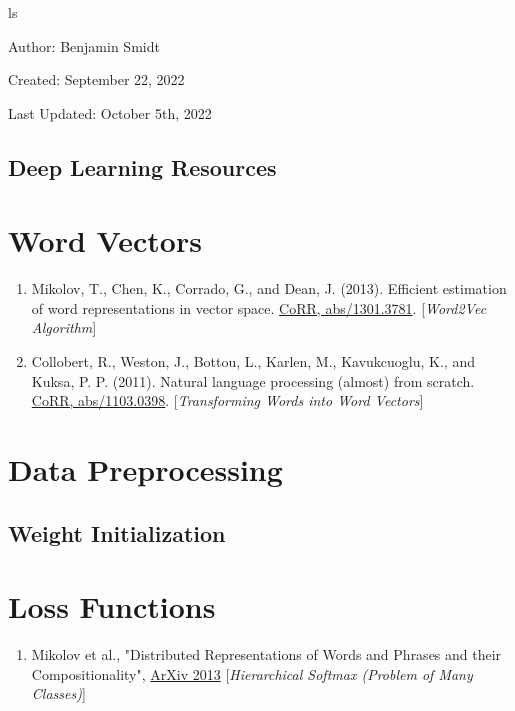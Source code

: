 ls




\noindent Author: Benjamin Smidt

\noindent Created: September 22, 2022

\noindent Last Updated: October 5th, 2022
\begin{center}
\section*{Deep Learning Resources}
\end{center}

\tableofcontents{}

\section{Word Vectors}
\begin{enumerate}
\item Mikolov, T., Chen, K., Corrado, G., and Dean, J. (2013). 
    Efficient estimation of word representations in vector space. 
    \href{https://arxiv.org/abs/1301.3781}{CoRR, abs/1301.3781}. 
    [\emph{Word2Vec Algorithm}]
\item Collobert, R., Weston, J., Bottou, L., Karlen, M., Kavukcuoglu, K., and Kuksa, P. P. 
    (2011). Natural language processing (almost) from scratch. 
    \href{https://arxiv.org/abs/1103.0398}{CoRR, abs/1103.0398}.
    [\emph{Transforming Words into Word Vectors}]
\end{enumerate}

\section{Data Preprocessing}

\subsection{Weight Initialization}

\section{Loss Functions}
\begin{enumerate}
\item Mikolov et al., 
    "Distributed Representations of Words and Phrases and their
    Compositionality", 
    \href{https://arxiv.org/abs/1310.4546}{ArXiv 2013}
    [\emph{Hierarchical Softmax (Problem of Many Classes)}]
\end{enumerate}


